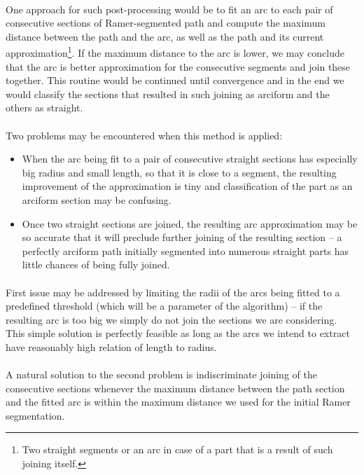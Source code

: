 \paragraph*{}
One approach for such post-processing would be to fit an arc to each pair of consecutive sections of Ramer-segmented path and compute the maximum distance between the path and the arc, as well as the path and its current approximation\footnote{Two straight segments or an arc in case of a part that is a result of such joining itself.}. If the maximum distance to the arc is lower, we may conclude that the arc is better approximation for the consecutive segments and join these together. This routine would be continued until convergence and in the end we would classify the sections that resulted in such joining as arciform and the others as straight.

\paragraph*{}
Two problems may be encountered when this method is applied:

\begin{itemize}
	\item When the arc being fit to a pair of consecutive straight sections has especially big radius and small length, so that it is close to a segment, the resulting improvement of the approximation is tiny and classification of the part as an arciform section may be confusing.
	\item Once two straight sections are joined, the resulting arc approximation may be so accurate that it will preclude further joining of the resulting section -- a perfectly arciform path initially segmented into numerous straight parts has little chances of being fully joined.
\end{itemize}

\paragraph*{}
First issue may be addressed by limiting the radii of the arcs being fitted to a predefined threshold (which will be a parameter of the algorithm) -- if the resulting arc is too big we simply do not join the sections we are considering. This simple solution is perfectly feasible as long as the arcs we intend to extract have reasonably high relation of length to radius.

\paragraph*{}
A natural solution to the second problem is indiscriminate joining of the consecutive sections whenever the maximum distance between the path section and the fitted arc is within the maximum distance we used for the initial Ramer segmentation.

